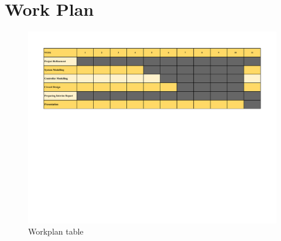 \section{Work Plan}
\begin{figure}[!h]
\includegraphics[width=1.059\linewidth]{Figures/workplan3}
\caption{Workplan table}
\end{figure}
